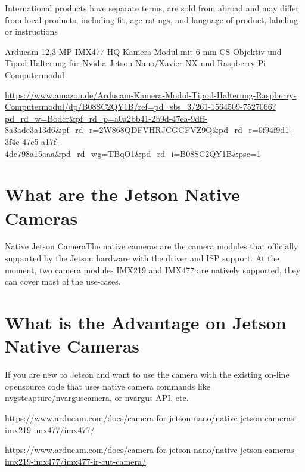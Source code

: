 International products have separate terms, are sold from abroad and may differ from local products, including fit, age ratings, and language of product, labeling or instructions



Arducam 12,3 MP IMX477 HQ Kamera-Modul mit 6 mm CS Objektiv und Tipod-Halterung für Nvidia Jetson Nano/Xavier NX und Raspberry Pi Computermodul

\url{https://www.amazon.de/Arducam-Kamera-Modul-Tipod-Halterung-Raspberry-Computermodul/dp/B08SC2QY1B/ref=pd_sbs_3/261-1564509-7527066?pd_rd_w=Bodcr&pf_rd_p=a0a2bb41-2b9d-47ea-9dff-8a3ade3a13d6&pf_rd_r=2W868QDFVHRJCGGFVZ9Q&pd_rd_r=0f94f9d1-3f4c-47c5-a17f-4dc798a15aaa&pd_rd_wg=TBqO1&pd_rd_i=B08SC2QY1B&psc=1}



    
\section{What are the Jetson Native Cameras}

Native Jetson CameraThe native cameras are the camera modules that officially supported by the Jetson hardware with the driver and ISP support. At the moment, two camera modules IMX219 and IMX477 are natively supported, they can cover most of the use-cases.

\section{What is the Advantage on Jetson Native Cameras}

If you are new to Jetson and want to use the camera with the existing on-line opensource code that uses native camera commands like nvgstcapture/nvarguscamera, or nvargus API, etc.


\url{https://www.arducam.com/docs/camera-for-jetson-nano/native-jetson-cameras-imx219-imx477/imx477/}

\url{https://www.arducam.com/docs/camera-for-jetson-nano/native-jetson-cameras-imx219-imx477/imx477-ir-cut-camera/}

